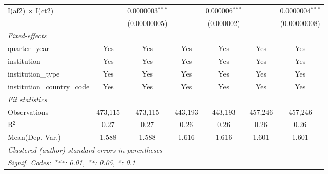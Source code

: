 \begin{tabular}{lcccccc}
   I(af\^2) $\times$ I(ct\^2)         &                & 0.0000003$^{***}$ &               & 0.000006$^{***}$ &               & 0.0000004$^{***}$\\   
                                      &                & (0.00000005)      &               & (0.000002)       &               & (0.00000008)\\   
   \midrule
   \emph{Fixed-effects}\\
   quarter\_year                      & Yes            & Yes               & Yes           & Yes              & Yes           & Yes\\  
   institution                        & Yes            & Yes               & Yes           & Yes              & Yes           & Yes\\  
   institution\_type                  & Yes            & Yes               & Yes           & Yes              & Yes           & Yes\\  
   institution\_country\_code         & Yes            & Yes               & Yes           & Yes              & Yes           & Yes\\  
   \midrule
   \emph{Fit statistics}\\
   Observations                       & 473,115        & 473,115           & 443,193       & 443,193          & 457,246       & 457,246\\  
   R$^2$                              & 0.27           & 0.27              & 0.26          & 0.26             & 0.26          & 0.26\\  
Mean(Dep. Var.) & 1.588 & 1.588 & 1.616 & 1.616 & 1.601 & 1.601 \\
   \midrule \midrule
   \multicolumn{7}{l}{\emph{Clustered (author) standard-errors in parentheses}}\\
   \multicolumn{7}{l}{\emph{Signif. Codes: ***: 0.01, **: 0.05, *: 0.1}}\\
\end{tabular}
\par\endgroup
